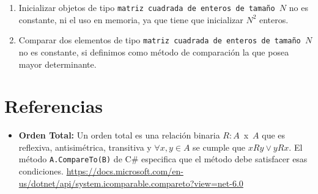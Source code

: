 \documentclass[14pt]{extarticle}
\begin{document}
\begin{enumerate}
    \item Inicializar objetos de tipo \texttt{matriz cuadrada de enteros de tamaño $N$} no es constante, ni el uso en memoria, ya que tiene que inicializar $N^2$ enteros.
    \item Comparar dos elementos de tipo \texttt{matriz cuadrada de enteros de tamaño $N$} no es constante, si definimos como método de comparación la que posea mayor determinante. 
\end{enumerate}

\section{Referencias}
\label{sec:Referencias}
\begin{itemize}
    \item \textbf{Orden Total:} Un orden total  es una relación binaria $R: A \,$ x $\, A$ que es reflexiva, antisimétrica, transitiva y $\forall x,y \in A$ se cumple que $xRy \vee yRx $. El método \texttt{A.CompareTo(B)} de C\# especifica que el método debe satisfacer esas condiciones. \url{https://docs.microsoft.com/en-us/dotnet/api/system.icomparable.compareto?view=net-6.0}  
\end{itemize}
\end{document}
